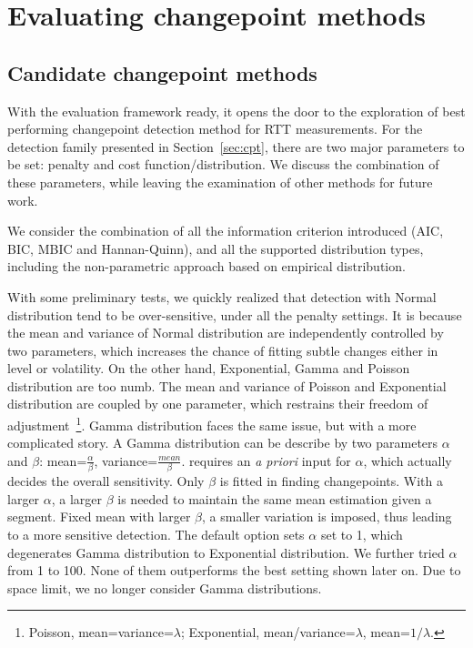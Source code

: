 \section{Evaluating changepoint methods}
\subsection{Candidate changepoint methods}
\label{sec:method}
With the evaluation framework ready, it opens the door to the exploration of best performing changepoint detection method for RTT measurements.
For the detection family presented in Section~\ref{sec:cpt}, there are two major parameters to be set: penalty and cost function/distribution.
We discuss the combination of these parameters, while leaving the examination of other methods for future work.

We consider the combination of all the information criterion introduced (AIC, BIC, MBIC and Hannan-Quinn), and all the supported distribution types, including the non-parametric approach based on empirical distribution.

With some preliminary tests, we quickly realized that detection with Normal distribution tend to be over-sensitive, under all the penalty settings.
It is because the mean and variance of Normal distribution are independently controlled by two parameters, which increases the chance of fitting subtle changes either in level or volatility.
On the other hand, Exponential, Gamma and Poisson distribution are too numb.
The mean and variance of Poisson and Exponential distribution are coupled by one parameter,
which restrains their freedom of adjustment~\footnote{Poisson, mean=variance=$\lambda$; Exponential, mean/variance=$\lambda$, mean=$1/\lambda$.}.
Gamma distribution faces the same issue, but with a more complicated story.
A Gamma distribution can be describe by two parameters $\alpha$ and $\beta$: mean=$\frac{\alpha}{\beta}$, variance=$\frac{mean}{\beta}$.
\cite{Killick2013a} requires an \textit{a priori} input for $\alpha$, which actually decides the overall sensitivity. 
Only $\beta$ is fitted in finding changepoints.
With a larger $\alpha$, a larger $\beta$ is needed to maintain the same mean estimation given a segment.
Fixed mean with larger $\beta$, a smaller variation is imposed, thus leading to a more sensitive detection.
The default option sets $\alpha$ set to 1, which degenerates Gamma distribution to Exponential distribution. 
We further tried $\alpha$ from 1 to 100. 
None of them outperforms the best setting shown later on. 
Due to space limit, we no longer consider Gamma distributions.

